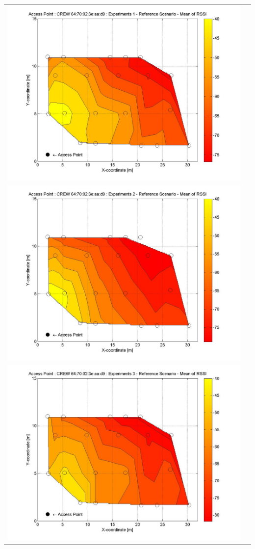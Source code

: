 \documentclass[11pt,a4paper,headinclude,footinclude,chapterprefix=on]{scrreprt}
\begin{document}
\begin{longtable}
	{lr} 
	\includegraphics[width=13cm]{../../Source/plot/CREW_d9/d9_Ref_Ex_1_Mean.jpg} \\
	\includegraphics[width=13cm]{../../Source/plot/CREW_d9/d9_Ref_Ex_2_Mean.jpg} \\
	\includegraphics[width=13cm]{../../Source/plot/CREW_d9/d9_Ref_Ex_3_Mean.jpg} \\

\end{longtable}
\end{document}

